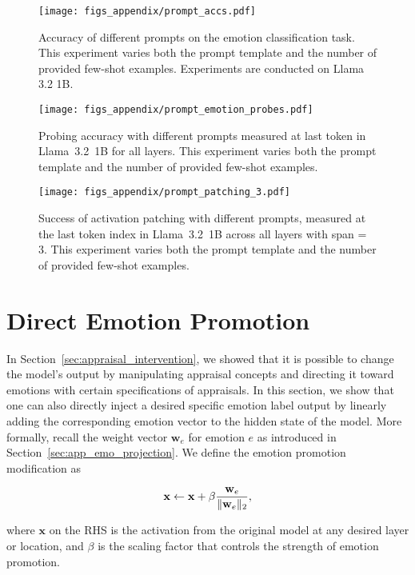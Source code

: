 \begin{figure}[bht]
    \centering
    \texttt{[image: figs\_appendix/prompt\_accs.pdf]}
  \caption{Accuracy of different prompts on the emotion classification task. This experiment varies both the prompt template and the number of provided few-shot examples. Experiments are conducted on Llama 3.2 1B.}
  \label{fig:prompt_accs}
\end{figure} 

\begin{figure*}[bht]
    \centering
    \texttt{[image: figs\_appendix/prompt\_emotion\_probes.pdf]}
  \caption{Probing accuracy with different prompts measured at last token in Llama~3.2~1B for all layers. This experiment varies both the prompt template and the number of provided few-shot examples.}
  \label{fig:prompt_probe}
\end{figure*} 

\begin{figure*}[bht]
    \centering
    \texttt{[image: figs\_appendix/prompt\_patching\_3.pdf]}
  \caption{Success of activation patching with different prompts, measured at the last token index in Llama~3.2~1B across all layers with span = 3. This experiment varies both the prompt template and the number of provided few-shot examples.}
  \label{fig:prompt_patch}
\end{figure*} 


\section{Direct Emotion Promotion} \label{app:emotion_promotion}

In Section~\ref{sec:appraisal_intervention}, we showed that it is possible to change the model's output by manipulating appraisal concepts and directing it toward emotions with certain specifications of appraisals. In this section, we show that one can also directly inject a desired specific emotion label output by linearly adding the corresponding emotion vector to the hidden state of the model. More formally, recall the weight vector $\mathbf{w}_e$ for emotion $e$ as introduced in Section~\ref{sec:app_emo_projection}. We define the emotion promotion modification as 

\[
    \mathbf{x} \leftarrow \mathbf{x} + \beta \frac{\mathbf{w}_e}{\lVert\mathbf{w}_e\rVert_2},
\]

where $\mathbf{x}$ on the RHS is the activation from the original model at any desired layer or location, and $\beta$ is the scaling factor that controls the strength of emotion promotion.

